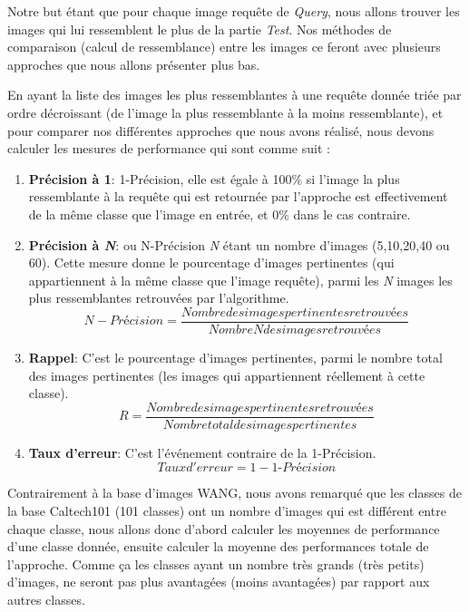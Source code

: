 	Notre but étant que pour chaque image requête de \textit{Query}, nous allons trouver les images qui lui ressemblent le plus de la partie \textit{Test}. Nos méthodes de comparaison (calcul de ressemblance) entre les images ce feront avec plusieurs approches que nous allons présenter plus bas.

	En ayant la liste des images les plus ressemblantes à une requête donnée triée par ordre décroissant (de l'image la plus ressemblante à la moins ressemblante), et pour comparer nos différentes approches que nous avons réalisé, nous devons calculer les mesures de performance qui sont comme suit : 
\begin{enumerate}

\item \textbf{Précision à 1}: 1-Précision, elle est égale à 100\% si l'image la plus ressemblante à la requête qui est retournée par l'approche est effectivement de la même classe que l'image en entrée, et 0\% dans le cas contraire.
\item \textbf{Précision à \textit{N}}: ou N-Précision \textit{N} étant un nombre d'images (5,10,20,40 ou 60). Cette mesure donne le pourcentage d'images  pertinentes (qui appartiennent à la même classe que l'image requête), parmi les \textit{N} images les plus ressemblantes retrouvées par l'algorithme.
$$N-Précision = \frac{Nombre des images pertinentes retrouvées}{Nombre N des images retrouvées}$$
\item \textbf{Rappel}: C'est le pourcentage d'images  pertinentes, parmi le nombre total des images pertinentes (les images qui appartiennent réellement à cette classe).
$$R = \dfrac{Nombre des images pertinentes retrouvées}{Nombre total des images pertinentes}$$
\item \textbf{Taux d'erreur}: C'est l’événement contraire de la 1-Précision.
$$Taux d'erreur = 1 - \textit{1-Précision}$$



\end{enumerate}

	Contrairement à la base d'images WANG, nous avons remarqué que les classes de la base Caltech101 (101 classes) ont un nombre d'images qui est différent entre chaque classe, nous allons donc d'abord calculer les moyennes de performance d'une classe donnée, ensuite calculer la moyenne des performances totale de l'approche. Comme ça les classes ayant un nombre très grands (très petits) d'images, ne seront pas plus avantagées (moins avantagées) par rapport aux autres classes.
	
